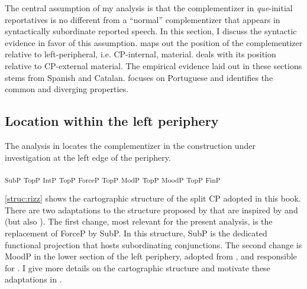 The central assumption of my analysis is that the complementizer in \emph{que}-initial reportatives is no different from a ``normal'' complementizer that appears in syntactically subordinate reported speech. In this section, I discuss the syntactic evidence in favor of this assumption.  maps out the position of the complementizer relative to left-peripheral, i.e. CP-internal, material.  deals with its position  relative to CP-external material. The empirical evidence laid out in these sections stems from Spanish and Catalan.  focuses on Portuguese and identifies the common and diverging properties.

\subsection{Location within the left periphery}\label{sec:insubwlp}

The analysis  in  locates the complementizer in the construction under investigation at the left edge of the  periphery. 

\ea\label{struc:rizz} {\ob}\textsubscript{SubP} {\ob}\textsubscript{TopP} {\ob}\textsubscript{IntP} {\ob}\textsubscript{TopP} {\ob}\textsubscript{ForceP} {\ob}\textsubscript{TopP} {\ob}\textsubscript{ModP} {\ob}\textsubscript{TopP} {\ob}\textsubscript{MoodP} {\ob}\textsubscript{TopP} {\ob}\textsubscript{FinP} {\cb}{\cb}{\cb}{\cb}{\cb}{\cb}{\cb}{\cb}{\cb}{\cb}{\cb}
\z


 \eqref{struc:rizz} shows the cartographic structure of the split CP adopted in this book. 
There are two adaptations to the structure proposed by \citet{Rizzi1997, Rizzi2004, Rizzi2013} that are inspired by \citet{Haegeman2004, Haegeman2006} and \citet{Lohnstein2015} (but also  \citealt{Roussou2010}). The first change, most relevant for the present analysis, is the replacement of ForceP by SubP. In this structure, SubP is the dedicated functional projection that hosts subordinating conjunctions. 
The second change is MoodP in the lower section of the left periphery,  adopted from \citet{Lohnstein2015}, and  responsible for . I give more details on the cartographic structure and motivate these adaptations in   . 

